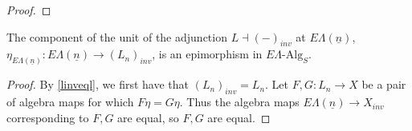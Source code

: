 \documentclass{amsbook} %
\newcommand{\ELn}{E\Lambda(\underline{n})}
\newenvironment{eq*}{\begin{equation*}}{\end{equation*}}
\numberwithin{section}{chapter}
\begin{document}
\begin{proof}
\end{proof}


\begin{cor} \label{epi} The component of the unit of the adjunction $L \dashv (-)_{inv}$ at $E\Lambda(\underline{n})$,  $\eta_{E\Lambda(\underline{n})}: E\Lambda(\underline{n}) \to (L_n)_{inv}$, is an epimorphism in $E\Lambda\mbox{-}\mathrm{Alg}_S$.
\end{cor}
\begin{proof}

By \cref{linveql}, we first have that $(L_n)_{inv} = L_n$. Let $F,G: L_n \to X$ be a pair of algebra maps for which $F \eta = G \eta$. Thus the algebra maps $E\Lambda(\underline{n}) \to X_{inv}$ corresponding to $F, G$ are equal, so $F,G$ are equal.



\end{proof}
\end{document}
